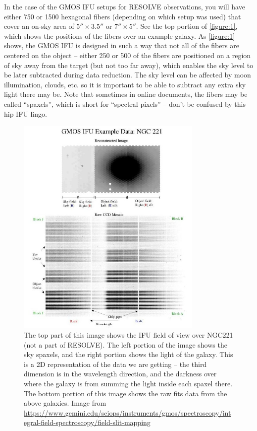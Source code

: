 \documentclass[12pt]{report}
\begin{document}
In the case of the GMOS IFU setups for RESOLVE observations, you will have either 750 or 1500 hexagonal fibers (depending on which setup was used) that cover an on-sky area of $5''\times3.5''$ or $7''\times5''$. See the top portion of \autoref{figure:1}, which shows the positions of the fibers over an example galaxy. As \autoref{figure:1} shows, the GMOS IFU is designed in such a way that not all of the fibers are centered on the object -- either 250 or 500 of the fibers are positioned on a region of sky away from the target (but not too far away), which enables the sky level to be later subtracted during data reduction. The sky level can be affected by moon illumination, clouds, etc. so it is important to be able to subtract any extra sky light there may be. Note that sometimes in online documents, the fibers may be called ``spaxels'', which is short for ``spectral pixels'' -- don't be confused by this hip IFU lingo.

\begin{figure}[h]
\centering
\includegraphics[width=0.8\textwidth]{fiber_examples.jpeg}
\caption[IFU Fibers and Data Format]{The top part of this image shows the IFU field of view over NGC221 (not a part of RESOLVE). The left portion of the image shows the sky spaxels, and the right portion shows the light of the galaxy. This is a 2D representation of the data we are getting -- the third dimension is in the wavelength direction, and the darkness over where the galaxy is from summing the light inside each spaxel there. The bottom portion of this image shows the raw fits data from the above galaxies.  \footnotesize{Image from \url{https://www.gemini.edu/sciops/instruments/gmos/spectroscopy/integral-field-spectroscopy/field-slit-mapping}}}
\label{figure:1}
\end{figure}
\end{document}
